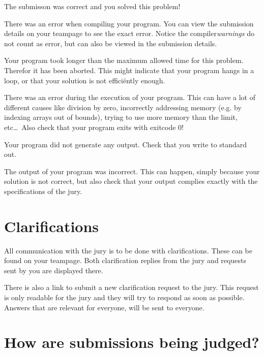 \documentclass[11pt,a4paper]{article}
\begin{document}
\begin{description}[\setleftmargin{4.5cm}]
\item[CORRECT]
The submisson was correct and you solved this problem!

\item[COMPILER-ERROR]
There was an error when compiling your program. You can view the
submission details on your teampage to see the exact error.
Notice the compiler\emph{warnings} do not count as error, but can also
be viewed in the submission details.

\item[TIMELIMIT]
Your program took longer than the maximum allowed time for this
problem. Therefor it has been aborted. This might indicate that your
program hangs in a loop, or that your solution is not effici\"ently
enough.

\item[RUN-ERROR]
There was an error during the execution of your program. This can have
a lot of different causes like division by zero, incorrectly
addressing memory (e.g. by indexing arrays out of bounds), trying to
use more memory than the limit, etc\dots\ 
Also check that your program exits with exitcode 0!

\item[NO-OUTPUT]
Your program did not generate any output. Check that you write to
standard out.

\item[WRONG-ANSWER]
The output of your program was incorrect. This can happen, simply
because your solution is not correct, but also check that your output
complies exactly with the specifications of the jury.
\end{description}

\section{Clarifications}

All communication with the jury is to be done with clarifications.
These can be found on your teampage. Both clarification replies from
the jury and requests sent by you are displayed  there.

There is also a link to submit a new clarification request to the
jury. This request is only readable for the jury and they will
try to respond as soon as possible. Answers that are relevant for
everyone, will be sent to everyone.

\section{How are submissions being judged?}
\end{document}
